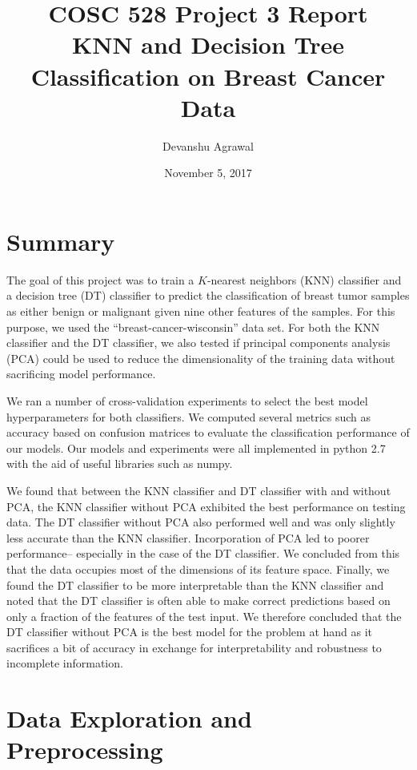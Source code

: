 \documentclass[12pt]{article}
\title{COSC 528 Project 3 Report \\
KNN and Decision Tree Classification on Breast Cancer Data}
\author{Devanshu Agrawal}
\date{November 5, 2017}
\begin{document}
\maketitle

\section{Summary}

The goal of this project was to train a $K$-nearest neighbors (KNN) classifier and a decision tree (DT) classifier to predict the classification of breast tumor samples as either benign or malignant given nine other features of the samples. For this purpose, we used the ``breast-cancer-wisconsin'' data set. For both the KNN classifier and the DT classifier, we also tested if principal components analysis (PCA) could be used to reduce the dimensionality of the training data without sacrificing model performance.

We ran a number of cross-validation experiments to select the best model hyperparameters for both classifiers. We computed several metrics such as accuracy based on confusion matrices to evaluate the classification performance of our models. Our models and experiments were all implemented in python 2.7 with the aid of useful libraries such as numpy.

We found that between the KNN classifier and DT classifier with and without PCA, the KNN classifier without PCA exhibited the best performance on testing data. The DT classifier without PCA also performed well and was only slightly less accurate than the KNN classifier. Incorporation of PCA led to poorer performance-- especially in the case of the DT classifier. We concluded from this that the data occupies most of the dimensions of its feature space. Finally, we found the DT classifier to be more interpretable than the KNN classifier and noted that the DT classifier is often able to make correct predictions based on only a fraction of the features of the test input. We therefore concluded that the DT classifier without PCA is the best model for the problem at hand as it sacrifices a bit of accuracy in exchange for interpretability and robustness to incomplete information.


\section{Data Exploration and Preprocessing}
\end{document}
